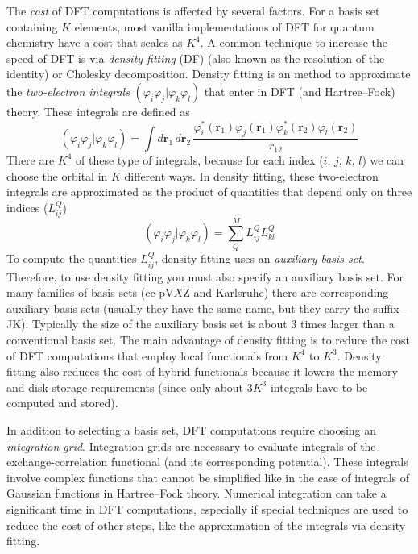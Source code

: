 \documentclass[../Main/chem371-notes.tex]{subfiles}
\begin{document}
The \emph{cost} of DFT computations is affected by several factors.
For a basis set containing $K$ elements, most vanilla implementations of DFT for quantum chemistry have a cost that scales as $K^4$.
A common technique to increase the speed of DFT is via \emph{density fitting} (DF) (also known as the resolution of the identity) or Cholesky decomposition.
Density fitting is an method to approximate the \emph{two-electron integrals} $(\varphi_i \varphi_j | \varphi_k \varphi_l)$ that enter in DFT (and Hartree--Fock) theory.
These integrals are defined as
\begin{equation}
(\varphi_i \varphi_j | \varphi_k \varphi_l) = 
\int d\mathbf{r}_1 \, d\mathbf{r}_2 \, \frac{\varphi^*_i(\mathbf{r}_1) \varphi_j(\mathbf{r}_1) \varphi^*_k(\mathbf{r}_2) \varphi_l(\mathbf{r}_2)}{r_{12}}
\end{equation}
There are $K^4$ of these type of integrals, because for each index ($i$, $j$, $k$, $l$) we can choose the orbital in $K$ different ways.
In density fitting, these two-electron integrals are approximated as the product of quantities that depend only on three indices ($L_{ij}^{Q}$)
\begin{equation}
(\varphi_i \varphi_j | \varphi_k \varphi_l) = \sum_Q^M L_{ij}^{Q} L_{kl}^{Q}
\end{equation}
To compute the quantities $L_{ij}^{Q}$, density fitting uses an \emph{auxiliary basis set}.
Therefore, to use density fitting you must also specify an auxiliary basis set.
For many families of basis sets (cc-pV$X$Z and Karlsruhe) there are corresponding auxiliary basis sets (usually they have the same name, but they carry the suffix -JK).
Typically the size of the auxiliary basis set is about 3 times larger than a conventional basis set.
The main advantage of density fitting is to reduce the cost of DFT computations that employ local functionals from $K^4$ to $K^3$.
Density fitting also reduces the cost of  hybrid functionals because it lowers the memory and disk storage requirements (since only about 3$K^3$ integrals have to be computed and stored).

In addition to selecting a basis set, DFT computations require choosing an \emph{integration grid}.
Integration grids are necessary to evaluate integrals of the exchange-correlation functional (and its corresponding potential).
These integrals involve complex functions that cannot be simplified like in the case of integrals of Gaussian functions in Hartree--Fock theory.
Numerical integration can take a significant time in DFT computations, especially if special techniques are used to reduce the cost of other steps, like the approximation of the integrals via density fitting.
\end{document}
